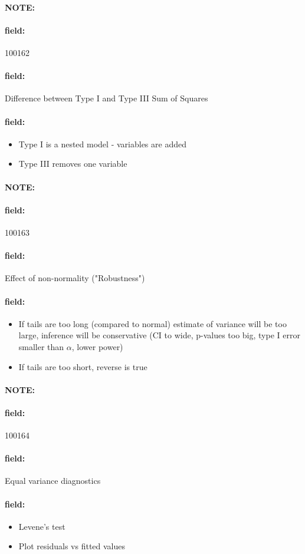 \documentclass[12pt]{article}
\newenvironment{note}{\paragraph{NOTE:}}{}
\newenvironment{field}{\paragraph{field:}}{}
\begin{document}
\begin{note}
    \begin{field}
        \tiny 100162
    \end{field}
    \begin{field}
        Difference between Type I and Type III Sum of Squares
    \end{field}
    \begin{field}
        \begin{itemize}
          \item Type I is a nested model - variables are added
          \item Type III removes one variable
        \end{itemize}
    \end{field}
\end{note}

\begin{note}
    \begin{field}
        \tiny 100163
    \end{field}
    \begin{field}
        Effect of non-normality ("Robustness")
    \end{field}
    \begin{field}
        \begin{itemize}
          \item If tails are too long (compared to normal) estimate of variance will be too large, inference will be conservative (CI to wide, p-values too big, type I error smaller than $\alpha$, lower power)
          \item If tails are too short, reverse is true
        \end{itemize}
    \end{field}
\end{note}

\begin{note}
    \begin{field}
        \tiny 100164
    \end{field}
    \begin{field}
        Equal variance diagnostics
    \end{field}
    \begin{field}
        \begin{itemize}
          \item Levene's test
          \item Plot residuals vs fitted values
        \end{itemize}
    \end{field}
\end{note}
\end{document}

